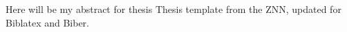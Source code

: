 Here will be my abstract for thesis  
Thesis template from the ZNN, updated for Biblatex and Biber.
